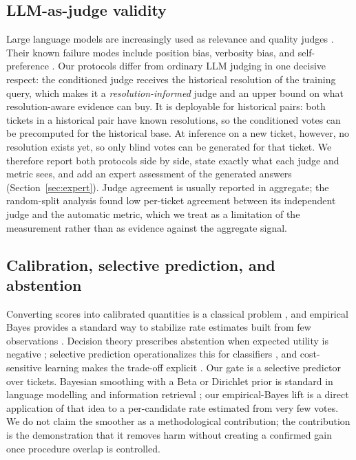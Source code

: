 \documentclass{ieeeaccess}
\begin{document}
\subsection{LLM-as-judge validity}
Large language models are increasingly used as relevance and quality judges
\cite{b11,b12,b35,b36}. Their known failure modes include position bias, verbosity
bias, and self-preference \cite{b13,b14}. Our protocols differ from ordinary LLM
judging in one decisive respect: the conditioned judge receives the historical
resolution of the training query, which makes it a \emph{resolution-informed}
judge and an upper bound on what resolution-aware evidence can buy. It is
deployable for historical pairs: both tickets in a historical pair have known
resolutions, so the conditioned votes can be precomputed for the historical base.
At inference on a new ticket, however, no resolution exists yet, so only blind
votes can be generated for that ticket. We therefore report both protocols side by side, state exactly
what each judge and metric sees, and add an expert assessment of the generated
answers (Section~\ref{sec:expert}). Judge agreement is usually reported in
aggregate; the random-split analysis found low per-ticket agreement between its
independent judge and the automatic metric, which we treat as a limitation of the
measurement rather than as evidence against the aggregate signal.

\subsection{Calibration, selective prediction, and abstention}
Converting scores into calibrated quantities is a classical problem
\cite{b15,b16,b17}, and empirical Bayes provides a standard way to stabilize rate
estimates built from few observations \cite{b18,b19,b38,b39}. Decision theory
prescribes abstention when expected utility is negative \cite{b20}; selective
prediction operationalizes this for classifiers \cite{b21}, and cost-sensitive
learning makes the trade-off explicit \cite{b22}. Our gate is a selective predictor
over tickets. Bayesian smoothing with a Beta or Dirichlet prior is standard in
language modelling and information retrieval \cite{b18,b19}; our empirical-Bayes
lift is a direct application of that idea to a per-candidate rate estimated from
very few votes. We do not claim the smoother as a methodological contribution; the
contribution is the demonstration that it removes harm without creating a confirmed
gain once procedure overlap is controlled.
\end{document}
